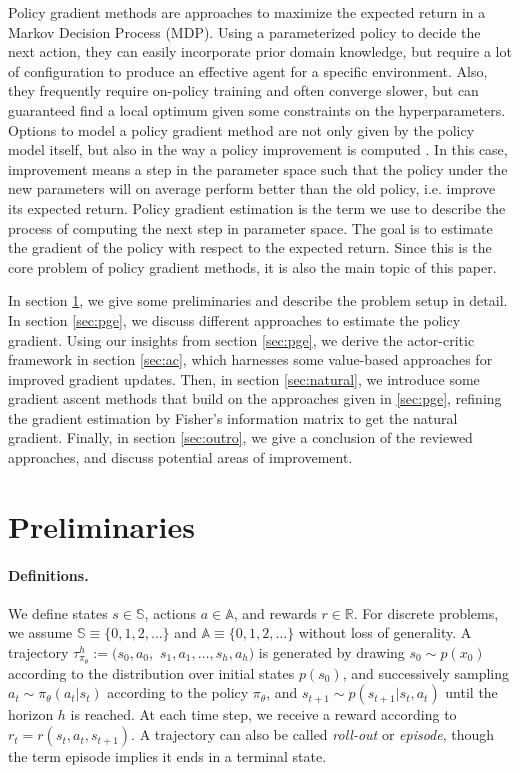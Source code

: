 Policy gradient methods are approaches to maximize the expected return in a Markov Decision Process (MDP). 
Using a parameterized policy to decide the next action, they can easily incorporate prior domain knowledge, but require a lot of configuration to produce an effective agent for a specific environment. 
Also, they frequently require on-policy training and often converge slower, but can guaranteed find a local optimum given some constraints on the hyperparameters. 
Options to model a policy gradient method are not only given by the policy model itself, but also in the way a policy improvement is computed \cite{DBLP:journals/corr/SchulmanMLJA15}. 
In this case, improvement means a step in the parameter space such that the policy under the new parameters will on average perform better than the old policy, i.e. improve its expected return. 
Policy gradient estimation is the term we use to describe the process of computing the next step in parameter space. 
The goal is to estimate the gradient of the policy with respect to the expected return. 
Since this is the core problem of policy gradient methods, it is also the main topic of this paper.

In section \ref{sec:prel}, we give some preliminaries and describe the problem setup in detail. 
In section \ref{sec:pge}, we discuss different approaches to estimate the policy gradient. 
Using our insights from section \ref{sec:pge}, we derive the actor-critic framework in section \ref{sec:ac}, which harnesses some value-based approaches for improved gradient updates. 
Then, in section \ref{sec:natural}, we introduce some gradient ascent methods that build on the approaches given in \ref{sec:pge}, refining the gradient estimation by Fisher's information matrix to get the natural gradient. 
Finally, in section \ref{sec:outro}, we give a conclusion of the reviewed approaches, and discuss potential areas of improvement.

\section{Preliminaries}
\label{sec:prel}

\paragraph{Definitions.} 
We define states $s \in \mathbb{S}$, actions $a \in \mathbb{A}$, and rewards $r \in \mathbb{R}$. 
For discrete problems, we assume $\mathbb{S} \equiv \{0,1,2,\ldots\}$ and $\mathbb{A} \equiv \{0,1,2,\ldots\}$ without loss of generality.
A trajectory $\tau_{\pi_\theta}^h := (s_0, a_0, $ $s_1, a_1, \dots, s_h, a_h)$ is generated by drawing $s_0 \sim p(x_0)$ according to the distribution over initial states $p(s_0)$, and successively sampling $a_t \sim \pi_\theta(a_t|s_t)$ according to the policy $\pi_\theta$, and $s_{t+1} \sim p(s_{t+1}|s_t,a_t)$ until the horizon $h$ is reached. 
At each time step, we receive a reward according to $r_t = r(s_t, a_t, s_{t+1})$. 
A trajectory can also be called \textit{roll-out} or \textit{episode}, though the term episode implies it ends in a terminal state.

